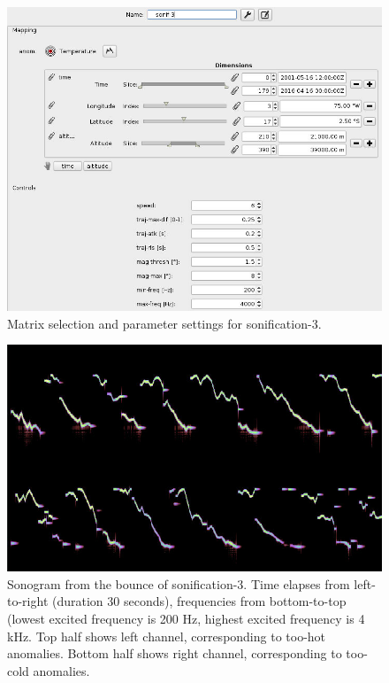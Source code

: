 \documentclass[11pt,a4paper]{article}
\begin{document}
\begin{figure}
\includegraphics[width=\textwidth]{figures/sonif-3-editor-shot.jpg}
\caption{Matrix selection and parameter settings for sonification-3.}
\label{fig:sonif-3-editor-shot}
\end{figure}

\begin{figure}
\includegraphics[width=\textwidth]{figures/sonif-3-bounce-sonogram.jpg}
\caption{Sonogram from the bounce of sonification-3. Time elapses from left-to-right (duration 30 seconds), frequencies from bottom-to-top (lowest excited frequency is 200 Hz, highest excited frequency is 4 kHz. Top half shows left channel, corresponding to too-hot anomalies. Bottom half shows right channel, corresponding to too-cold anomalies.}
\label{fig:sonif-3-bounce-sonogram}
\end{figure}
\end{document}
